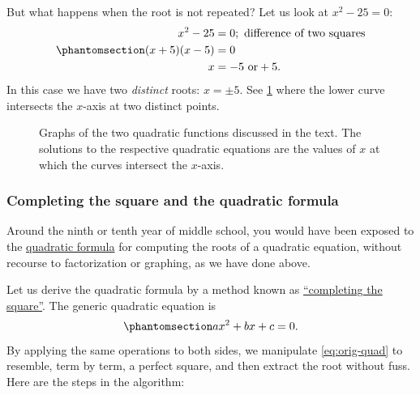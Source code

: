\documentclass[
  a4paper,
]{article}
\begin{document}
But what happens when the root is not repeated? Let us look at
\(x^2 - 25 = 0\):
\begin{equation}\phantomsection\label{eq:plus-minus-five}{
\begin{aligned}
x^2 - 25 &= 0; \text{ difference of two squares}\\
(x + 5)(x - 5) &= 0\\
x &= -5 \text{ or} +5.\\ 
\end{aligned}
}\end{equation} In this case we have two \emph{distinct} roots:
\(x = \pm5\). See \cref{fig:quadratic-graphs} where the lower curve
intersects the \(x\)-axis at two distinct points.

\begin{figure}
\centering

\caption{Graphs of the two quadratic functions discussed in the text.
The solutions to the respective quadratic equations are the values of
\(x\) at which the curves intersect the
\(x\)-axis.}\label{fig:quadratic-graphs}
\end{figure}

\subsubsection{Completing the square and the quadratic
formula}\label{completing-the-square-and-the-quadratic-formula}

Around the ninth or tenth year of middle school, you would have been
exposed to the
\href{https://en.wikipedia.org/wiki/Quadratic_formula}{quadratic
formula} for computing the roots of a quadratic equation, without
recourse to factorization or graphing, as we have done above.

Let us derive the quadratic formula by a method known as
\href{https://en.wikipedia.org/wiki/Completing_the_square}{``completing
the square''}. The generic quadratic equation is
\begin{equation}\phantomsection\label{eq:orig-quad}{
ax^2 + bx + c = 0.
}\end{equation} By applying the same operations to both sides, we
manipulate \cref{eq:orig-quad} to resemble, term by term, a perfect
square, and then extract the root without fuss. Here are the steps in
the algorithm:
\end{document}
